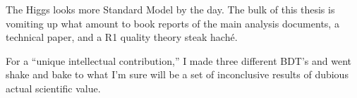 
The Higgs looks more Standard Model by the day.  The bulk of this thesis is vomiting up what amount to book reports of the main analysis documents, a technical paper, and a R1 quality theory steak hach\'e.

For a ``unique intellectual contribution,'' I made three different BDT's and went shake and bake to what I'm sure will be a set of inconclusive results of dubious actual scientific value.
